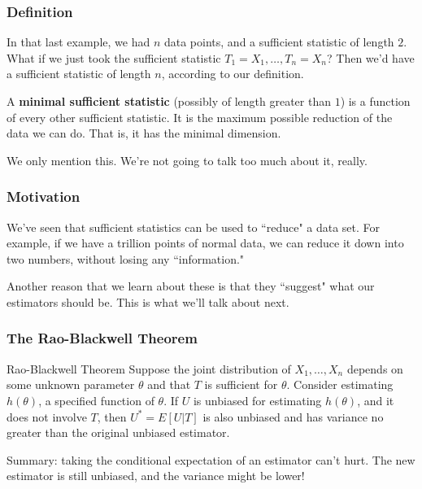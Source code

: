 \documentclass{beamer}
\begin{document}
\begin{frame}
\frametitle{Definition}

In that last example, we had $n$ data points, and a sufficient statistic of length $2$. What if we just took the sufficient statistic $T_1 = X_1, \ldots, T_n = X_n$? Then we'd have a sufficient statistic of length $n$, according to our definition. 
\newline
\pause

A \textbf{minimal sufficient statistic} (possibly of length greater than $1$) is a function of every other sufficient statistic. It is the maximum possible reduction of the data we can do. That is, it has the minimal dimension.
\newline
\pause

We only mention this. We're not going to talk too much about it, really.

\end{frame}
\begin{frame}
\frametitle{Motivation}

We've seen that sufficient statistics can be used to ``reduce" a data set. For example, if we have a trillion points of normal data, we can reduce it down into two numbers, without losing any ``information."
\newline

Another reason that we learn about these is that they ``suggest" what our estimators should be. This is what we'll talk about next.

\end{frame}


\begin{frame}
\frametitle{The Rao-Blackwell Theorem}

\begin{block}{Rao-Blackwell Theorem}
Suppose the joint distribution of $X_1, \ldots, X_n$ depends on some unknown parameter $\theta$ and that $T$ is sufficient for $\theta$. Consider estimating $h(\theta)$, a specified function of $\theta$. If $U$ is unbiased for estimating $h(\theta)$, and it does not involve $T$, then $U^* = E[U|T]$ is also unbiased and has variance no greater than the original unbiased estimator. 
\end{block}

Summary: taking the conditional expectation of an estimator can't hurt. The new estimator is still unbiased, and the variance might be lower!
\end{frame}
\end{document}
